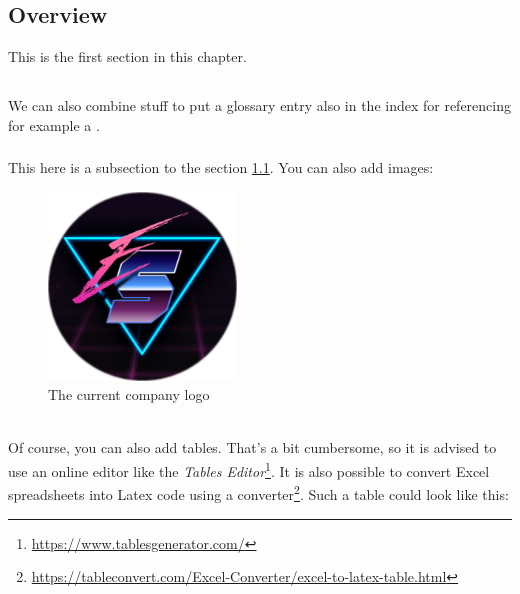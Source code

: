 
\chapter{}	%
\label{chap:solution}			%
\section{Overview}				%
\label{sec:overview}			%
This is the first section in this chapter.

\section{}
\label{sec:process}
We can also combine stuff to put a glossary entry also in the index for referencing for example a .

\subsection{}
This here is a subsection to the section \ref{sec:overview}.
You can also add images:
\begin{figure}[!h]	%
 \centering
  \includegraphics[width=5cm]{../LatexGlobal/images/CompanyLogo}	%
  \caption{The current company logo}								%
  \label{fig:companylogo}											%
\end{figure}
\\
Of course, you can also add tables. That's a bit cumbersome, so it is advised to use an online editor like the \emph{Tables Editor}\footnote{\url{https://www.tablesgenerator.com/}}. It is also possible to convert Excel spreadsheets into Latex code using a converter\footnote{\url{https://tableconvert.com/Excel-Converter/excel-to-latex-table.html}}.
Such a table could look like this:

